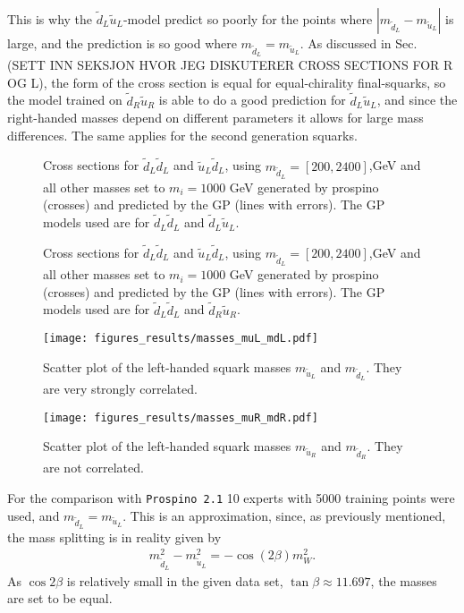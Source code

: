 \documentclass[twoside,english]{uiofysmaster}
\begin{document}
This is why the $\tilde{d}_L \tilde{u}_L$-model predict so poorly for the points where $|m_{\tilde{d}_L} - m_{\tilde{u}_L}|$
is large, and the prediction is so good where $m_{\tilde{d}_L} = m_{\tilde{u}_L}$. As discussed in Sec. (SETT INN SEKSJON HVOR JEG DISKUTERER CROSS SECTIONS FOR R OG L), the form of the cross section is equal for equal-chirality final-squarks, so the model trained on $\tilde{d}_R \tilde{u}_R$ is able to do a good prediction for $\tilde{d}_L \tilde{u}_L$, and since the right-handed masses depend on different parameters it allows for large mass differences. The same applies for the second generation squarks.


\begin{figure}
\caption{Cross sections for $\tilde{d}_L \tilde{d}_L$ and $\tilde{u}_L \tilde{d}_L$, using $m_{\tilde{d}_L}=[200, 2400]$,GeV and all other masses set to $m_i = 1000$ GeV generated by prospino (crosses) and predicted by the GP (lines with errors). The GP models used are for $\tilde{d}_L \tilde{d}_L$ and $\tilde{d}_L \tilde{u}_L$.}
\label{Fig:: results : dLuL prospino GP-L}
\end{figure}

\begin{figure}
\caption{Cross sections for $\tilde{d}_L \tilde{d}_L$ and $\tilde{u}_L \tilde{d}_L$, using $m_{\tilde{d}_L}=[200, 2400]$,GeV and all other masses set to $m_i = 1000$ GeV generated by prospino (crosses) and predicted by the GP (lines with errors). The GP models used are for $\tilde{d}_L \tilde{d}_L$ and $\tilde{d}_R \tilde{u}_R$.}
\label{Fig:: results : dLuL prospino GP-R}
\end{figure}

\begin{figure}
\centering
\texttt{[image: figures\_results/masses\_muL\_mdL.pdf]}
\caption{Scatter plot of the left-handed squark masses $m_{\tilde{u}_L}$ and $m_{\tilde{d}_L}$. They are very strongly correlated.}
\label{Fig:: results : mass scattering uLdL}
\end{figure}

\begin{figure}
\centering
\texttt{[image: figures\_results/masses\_muR\_mdR.pdf]}
\caption{Scatter plot of the left-handed squark masses $m_{\tilde{u}_R}$ and $m_{\tilde{d}_R}$. They are not correlated.}
\label{Fig:: results : mass scattering uRdR}
\end{figure}

For the comparison with \verb|Prospino 2.1| 10 experts with 5000 training points were used, and $m_{\tilde{d}_L}=m_{\tilde{u}_L}$. This is an approximation, since, as previously mentioned, the mass splitting is in reality given by
\begin{align}
m_{\tilde{d}_L}^2 - m_{\tilde{u}_L}^2 = - \cos (2 \beta) m_W^2.
\end{align}
As $\cos 2\beta$ is relatively small in the given data set, $\tan \beta \approx 11.697$, the masses are set to be equal.



\end{document}
